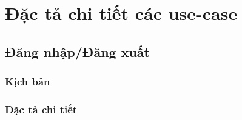 \section{Đặc tả chi tiết các use-case}
\subsection{Đăng nhập/Đăng xuất}
\subsubsection{Kịch bản}
\subsubsection{Đặc tả chi tiết}
